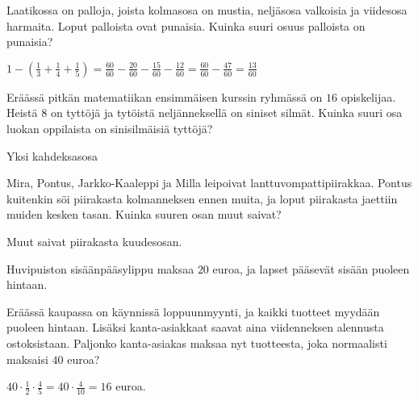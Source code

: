 \begin{tehtavasivu}
\begin{tehtava} 
        Laatikossa on palloja, joista kolmasosa on mustia, neljäsosa valkoisia ja viidesosa harmaita. Loput palloista ovat punaisia. Kuinka suuri osuus palloista on punaisia?
        \begin{vastaus}
            $1-(\frac{1}{3}+\frac{1}{4}+\frac{1}{5})
            = \frac{60}{60}-\frac{20}{60}-\frac{15}{60}-\frac{12}{60}
            = \frac{60}{60}-\frac{47}{60}
            = \frac{13}{60}$
        \end{vastaus}
    \end{tehtava}
    
\begin{tehtava} 
Eräässä pitkän matematiikan ensimmäisen kurssin ryhmässä on $16$ opiskelijaa. Heistä $8$ on tyttöjä ja tytöistä neljänneksellä on siniset silmät. Kuinka suuri osa luokan oppilaista on sinisilmäisiä tyttöjä?
        \begin{vastaus}
			Yksi kahdeksasosa
        \end{vastaus}
\end{tehtava}


\begin{tehtava}
Mira, Pontus, Jarkko-Kaaleppi ja Milla leipoivat lanttuvompattipiirakkaa. Pontus kuitenkin söi piirakasta kolmanneksen ennen muita, ja loput piirakasta jaettiin muiden kesken tasan. Kuinka suuren osan muut saivat?
        \begin{vastaus}
            Muut saivat piirakasta kuudesosan.
        \end{vastaus}
\end{tehtava}
    
\begin{tehtava}
    Huvipuiston sisäänpääsylippu maksaa $20$ euroa, ja lapset pääsevät sisään puoleen hintaan.
    \begin{vastaus}
    \end{vastaus}
\end{tehtava}  

\begin{tehtava}
	Eräässä kaupassa on käynnissä loppuunmyynti, ja kaikki tuotteet myydään puoleen hintaan. Lisäksi kanta-asiakkaat saavat aina viidenneksen alennusta ostoksistaan. Paljonko kanta-asiakas maksaa nyt tuotteesta, joka normaalisti maksaisi $40$ euroa?
    \begin{vastaus}
		$40\cdot \frac{1}{2} \cdot \frac{4}{5}=40\cdot \frac{4}{10}= 16$ euroa.
	\end{vastaus}
\end{tehtava}
    

\end{tehtavasivu}

